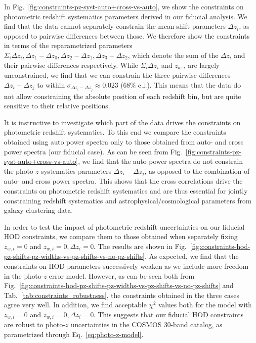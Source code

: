 \documentclass[a4paper,11pt]{article}
\begin{document}
In Fig.~\ref{fig:constraints-pz-syst-auto+cross-vs-auto}, we show the constraints on photometric redshift systematics parameters derived in our fiducial analysis. We find that the data cannot separately constrain the mean shift parameters $\Delta z_{i}$, as opposed to pairwise differences between those. We therefore show the constraints in terms of the reparametrized parameters $\Sigma_{i} \Delta z_{i}, \Delta z_{1} - \Delta z_{0}, \Delta z_{2} - \Delta z_{1}, \Delta z_{3} - \Delta z_{2}$, which denote the sum of the $\Delta z_{i}$ and their pairwise differences respectively. While $\Sigma_{i} \Delta z_{i}$ and $z_{w, i}$ are largely unconstrained, we find that we can constrain the three pairwise differences $\Delta z_{i} - \Delta z_{j}$ to within $\sigma_{\Delta z_{i} - \Delta z_{j}} \approx 0.023$ ($68 \%$ c.l.). This means that the data do not allow constraining the absolute position of each redshift bin, but are quite sensitive to their relative positions.

It is instructive to investigate which part of the data drives the constraints on photometric redshift systematics. To this end we compare the constraints obtained using auto power spectra only to those obtained from auto- and cross power spectra (our fiducial case). As can be seen from Fig.~\ref{fig:constraints-pz-syst-auto+cross-vs-auto}, we find that the auto power spectra do not constrain the photo-$z$ systematics parameters $\Delta z_{i} - \Delta z_{j}$, as opposed to the combination of auto- and cross power spectra. This shows that the cross correlations drive the constraints on photometric redshift systematics and are thus essential for jointly constraining redshift systematics and astrophysical/cosmological parameters from galaxy clustering data.

In order to test the impact of photometric redshift uncertainties on our fiducial HOD constraints, we compare them to those obtained when separately fixing $z_{w, i} = 0$ and $z_{w, i} = 0, \Delta z_{i} = 0$. The results are shown in Fig.~\ref{fig:constraints-hod-pz-shifts-pz-widths-vs-pz-shifts-vs-no-pz-shifts}. As expected, we find that the constraints on HOD parameters successively weaken as we include more freedom in the photo-$z$ error model. However, as can be seen both from Fig.~\ref{fig:constraints-hod-pz-shifts-pz-widths-vs-pz-shifts-vs-no-pz-shifts} and Tab.~\ref{tab:constraints_robustness}, the constraints obtained in the three cases agree very well. In addition, we find acceptable $\chi^{2}$ values both for the model with $z_{w, i} = 0$ and $z_{w, i} = 0, \Delta z_{i} = 0$. This suggests that our fiducial HOD constraints are robust to photo-$z$ uncertainties in the COSMOS 30-band catalog, as parametrized through Eq.~\ref{eq:photo-z-model}. 
\end{document}
